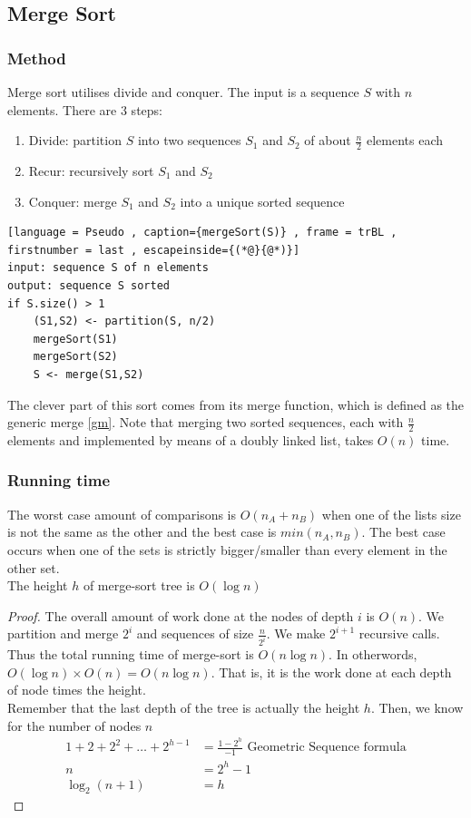 \documentclass[a4paper]{article}
\theoremstyle{plain}
\theoremstyle{definition}
\theoremstyle{remark}
\begin{document}
\subsection{Merge Sort}
\subsubsection{Method}

Merge sort utilises divide and conquer. The input is a sequence $S$ with $n$ elements. There are $3$ steps:
\begin{enumerate}
	\item Divide: partition $S$ into two sequences $S_1$ and $S_2$ of about $\frac{n}{2}$ elements each
	\item Recur: recursively sort $S_1$ and $S_2$ 
	\item Conquer: merge $S_1 $ and $S_2$ into a unique sorted sequence
\end{enumerate}
\begin{lstlisting}[language = Pseudo , caption={mergeSort(S)} , frame = trBL , firstnumber = last , escapeinside={(*@}{@*)}]
input: sequence S of n elements
output: sequence S sorted
if S.size() > 1
	(S1,S2) <- partition(S, n/2)
	mergeSort(S1)
	mergeSort(S2)
	S <- merge(S1,S2)	
\end{lstlisting}
The clever part of this sort comes from its merge function, which is defined as the generic merge \ref{gm}. Note that merging two sorted sequences, each with $\frac{n}{2}$ elements and implemented by means of a doubly linked list, takes $O(n)$ time. 
\subsubsection{Running time}
The worst case amount of comparisons is $O(n_A+n_B)$ when one of the lists size is not the same as the other and the best case is $min(n_A,n_B)$. The best case occurs when one of the sets is strictly bigger/smaller than every element in the other set.  \\
The height $h$ of merge-sort tree is $O(\log n)$
\begin{proof}
	The overall amount of work done at the nodes of depth $i$ is $O(n)$. We partition and merge $2^{i}$ and sequences of size $\frac{n}{2^{i}}$. We make $2^{i+1}$ recursive calls. Thus the total running time of merge-sort is $O(n \log n)$. In otherwords, $O(\log n) \times  O(n) = O(n \log n)$. That is, it is the work done at each depth of node times the height. \\
	Remember that the last depth of the tree is actually the height $h$. Then, we know for the number of nodes $n$ 
	\begin{align*}
		1+2+2^{2}+\ldots+2^{h-1} &= \frac{1-2^{h}}{-1} \text{ Geometric Sequence formula} \\
		n &= 2^{h}-1 \\
		\log_{2}(n+1) &= h
	\end{align*}
\end{proof}
\end{document}
